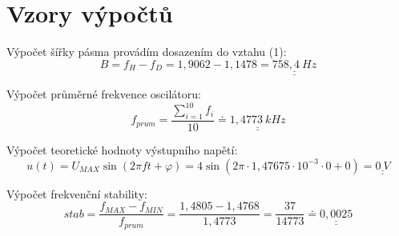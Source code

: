 \section*{Vzory výpočtů}
  
  Výpočet šířky pásma provádím dosazením do vztahu (1):
  \begin{equation}
    B = f_H - f_D = 1,9062 - 1,1478 = \underline{\underline{758,4~Hz}}
    \nonumber
  \end{equation}
  
  Výpočet průměrné frekvence oscilátoru:
  \begin{equation}
    f_{prum} = \dfrac{\sum_{i=1}^{10} f_i}{10} \doteq \underline{\underline{1,4773~kHz}}
    \nonumber
  \end{equation}   
  
  Výpočet teoretické hodnoty výstupního napětí:
  \begin{equation}
    u(t) = U_{MAX}\sin{(2\pi ft+\varphi)} = 4\sin{(2\pi \cdot 1,47675 \cdot 10^{-3} \cdot 0 + 0)}
     = \underline{\underline{0~V}}
    \nonumber
  \end{equation} 
    
  Výpočet frekvenční stability:
  \begin{equation}
  	stab = \dfrac{f_{MAX} - f_{MIN}}{f_{prum}} = \dfrac{1,4805 - 1,4768}{1,4773} = \dfrac{37}{14773} \doteq \underline{\underline{0,0025}}
  	\nonumber
  \end{equation}
 